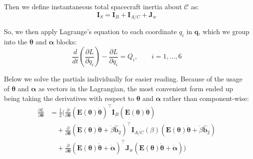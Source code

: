 \documentclass[titlepage]{article}
\begin{document}
Then we define instantaneous total spacecraft inertia about $\mathcal{C}$ as:
\begin{equation}
	\boldsymbol{I}_S=\boldsymbol{I}_B+\boldsymbol{I}_{A/C}+\boldsymbol{J}_w
\end{equation}

So, we then apply Lagrange's equation to each coordinate $q_i$ in $\boldsymbol{q}$, which we group into the $\boldsymbol{\theta}$ and $\boldsymbol{\alpha}$ blocks:
\begin{equation}
	\frac{d}{dt}\left(\frac{\partial L}{\partial\dot{q}_i}\right)-\frac{\partial L}{\partial q_i}=Q_i,\qquad i=1,\dots,6
\end{equation}

Below we solve the partials individually for easier reading. Because of the usage of $\boldsymbol{\theta}$ and $\boldsymbol{\alpha}$ as vectors in the Lagrangian, the most convenient form ended up being taking the derivatives with respect to $\boldsymbol{\theta}$ and $\boldsymbol{\alpha}$ rather than component-wise:
\begin{equation}
	\begin{split}
		\frac{\partial L}{\partial\boldsymbol{\theta}}&=\frac{1}{2}\bigg(\frac{\partial}{\partial\boldsymbol{\theta}}\left(\boldsymbol{E}(\boldsymbol{\theta})\dot{\boldsymbol{\theta}}\right)^\top\boldsymbol{I}_B\left(\boldsymbol{E}(\boldsymbol{\theta})\dot{\boldsymbol{\theta}}\right) \\
		&\quad+\frac{\partial}{\partial\boldsymbol{\theta}}\left(\boldsymbol{E}(\boldsymbol{\theta})\dot{\boldsymbol{\theta}}+\dot{\beta}\hat{\boldsymbol{b}}_2\right)^\top\boldsymbol{I}_{A/C}(\beta)\left(\boldsymbol{E}(\boldsymbol{\theta})\dot{\boldsymbol{\theta}}+\dot{\beta}\hat{\boldsymbol{b}}_2\right) \\
		&\quad+\frac{\partial}{\partial\boldsymbol{\theta}}\left(\boldsymbol{E}(\boldsymbol{\theta})\dot{\boldsymbol{\theta}}+\dot{\boldsymbol{\alpha}}\right)^\top\boldsymbol{J}_w\left(\boldsymbol{E}(\boldsymbol{\theta})\dot{\boldsymbol{\theta}}+\dot{\boldsymbol{\alpha}}\right)\bigg)
	\end{split}
	\label{eq:thetaterm}
\end{equation}
\end{document}
